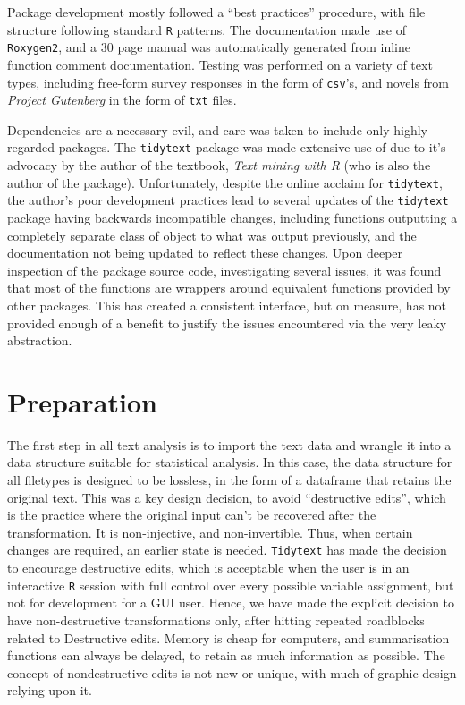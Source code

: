 \documentclass[11pt, a4paper, titlepage]{report}
\begin{document}
Package development mostly followed a ``best practices'' procedure,
with file structure following standard \texttt{R} patterns. The
documentation made use of \texttt{Roxygen2}\autocite{wickham18roxy},
and a 30 page manual was automatically generated from inline function
comment documentation. Testing was performed on a variety of text
types, including free-form survey responses in the form of
\texttt{csv}'s, and novels from \textit{Project Gutenberg} in the form of
\texttt{txt} files.

Dependencies are a necessary evil, and care was taken to include only
highly regarded packages. The \texttt{tidytext} package was made
extensive use of due to it's advocacy by the author of the textbook,
\textit{Text mining with R} (who is also the author of the
package). Unfortunately, despite the online acclaim for
\texttt{tidytext}, the author's poor development practices lead to
several updates of the \texttt{tidytext} package having backwards
incompatible changes, including functions outputting a completely
separate class of object to what was output previously, and the
documentation not being updated to reflect these changes. Upon deeper
inspection of the package source code, investigating several issues,
it was found that most of the functions are wrappers around equivalent
functions provided by other packages. This has created a consistent
interface, but on measure, has not provided enough of a benefit to
justify the issues encountered via the very leaky abstraction.

\section{Preparation}\label{sec:import}

The first step in all text analysis is to import the text data and
wrangle it into a data structure suitable for statistical analysis. In
this case, the data structure for all filetypes is designed to be
lossless, in the form of a dataframe that retains the original text.
This was a key design decision, to avoid ``destructive edits'', which is
the practice where the original input can't be recovered after the
transformation. It is non-injective, and non-invertible. Thus, when
certain changes are required, an earlier state is needed. \texttt{Tidytext} has
made the decision to encourage destructive edits, which is acceptable
when the user is in an interactive \texttt{R} session with full
control over every possible variable assignment, but not for
development for a GUI user. Hence, we have made the explicit decision
to have non-destructive transformations only, after hitting repeated
roadblocks related to Destructive edits. Memory is cheap for
computers, and summarisation functions can always be delayed, to
retain as much information as possible. The concept of nondestructive
edits is not new or unique, with much of graphic design relying upon
it\autocite{inc.:_nondes_editin_photos}.
\end{document}
